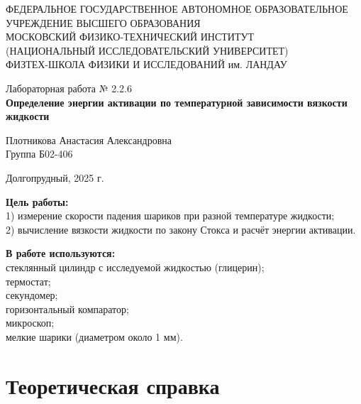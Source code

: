 \documentclass[a4paper,12pt]{article} %
\begin{document}
\begin{center}
	\footnotesize{ФЕДЕРАЛЬНОЕ ГОСУДАРСТВЕННОЕ АВТОНОМНОЕ ОБРАЗОВАТЕЛЬНОЕ 			УЧРЕЖДЕНИЕ ВЫСШЕГО ОБРАЗОВАНИЯ}\\
	\footnotesize{МОСКОВСКИЙ ФИЗИКО-ТЕХНИЧЕСКИЙ ИНСТИТУТ\\(НАЦИОНАЛЬНЫЙ 			ИССЛЕДОВАТЕЛЬСКИЙ УНИВЕРСИТЕТ)}\\
	\footnotesize{ФИЗТЕХ-ШКОЛА ФИЗИКИ И ИССЛЕДОВАНИЙ им. ЛАНДАУ\\}
	\hfill \break
	\hfill \break
	\hfill \break
	\hfill \break
\end{center}

\begin{center}   
    \hfill \break
	\hfill \break
	\hfill \break
	\hfill \break    \hfill \break
	\hfill \break
	\hfill \break
	\hfill \break
    \hfill \break
    \hfill \break
	\hfill \break
	\large{Лабораторная работа № 2.2.6 \\\textbf{Определение энергии активации
	по температурной зависимости вязкости жидкости}}\\
	\begin{flushright}
		Плотникова Анастасия Александровна\\
		Группа Б02-406
	\end{flushright}
	\hfill \break
	\hfill \break
	\hfill \break
\end{center}
\hfill \break
\hfill \break
\hfill \break
\hfill \break
\hfill \break
\hfill \break
\hfill \break
\hfill \break
\hfill \break
\hfill \break
\hfill \break
\hfill \break
\hfill \break
\begin{center}
	Долгопрудный, 2025 г.
\end{center}
\thispagestyle{empty}
\newpage
	\textbf{Цель работы:}\\ 
	1) измерение скорости падения шариков при разной температуре жидкости; \\
	2) вычисление вязкости жидкости по закону Стокса и расчёт энергии активации. \\
	\hfill \break
	
	\textbf{В работе используются:}\\ 
	стеклянный цилиндр с исследуемой жидкостью (глицерин); \\
	термостат; \\
	секундомер; \\
	горизонтальный компаратор; \\
	микроскоп; \\
	мелкие шарики (диаметром около 1 мм).
	
\section*{Теоретическая справка}
\end{document}
